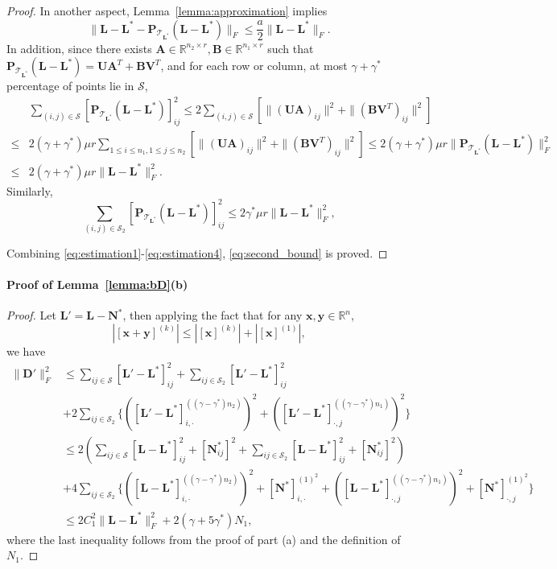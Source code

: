 \documentclass[12pt]{article}
\newcommand{\bx}{\boldsymbol{x}}
\newcommand{\by}{\boldsymbol{y}}
\newcommand{\bL}{\boldsymbol{L}}
\newcommand{\bP}{\boldsymbol{P}}
\newcommand{\bD}{\boldsymbol{D}}
\newcommand{\bU}{\boldsymbol{U}}
\newcommand{\bV}{\boldsymbol{V}}
\def\reals{\mathbb{R}}
\def\bx{\boldsymbol{x}}
\def\bP{\boldsymbol{P}}
\def\bU{\boldsymbol{U}}
\def\bA{\boldsymbol{A}}
\def\bB{\boldsymbol{B}}
\def\bN{\boldsymbol{N}}
\theoremstyle{plain}
\theoremstyle{definition}
\theoremstyle{plain}
\theoremstyle{plain}
\theoremstyle{remark}
\begin{document}
\begin{proof}
In another aspect, Lemma~\ref{lemma:approximation} implies
\begin{equation}
\|\bL-\bL^*-\bP_{\mathcal{T}_{\bL^*}}(\bL-\bL^*)\|_F\leq \frac{a}{2}\|\bL-\bL^*\|_F.\label{eq:estimation2}
\end{equation}
In addition, since there exists $\bA\in\reals^{n_2\times r},\bB\in\reals^{n_1\times r}$ such that $\bP_{\mathcal{T}_{\bL^*}}(\bL-\bL^*)=\bU\bA^T+\bB\bV^T$, and  for each row or column, at most $\gamma+\gamma^*$ percentage of points lie in $\mathcal{S}$, 
\begin{align}\nonumber
&\sum_{(i,j)\in\mathcal{S}}[\bP_{\mathcal{T}_{\bL^*}}(\bL-\bL^*)]_{ij}^2\leq 2 \sum_{(i,j)\in\mathcal{S}}[\|(\bU\bA)_{ij}\|^2+\|(\bB\bV^T)_{ij}\|^2]\\\leq&  2  (\gamma+\gamma^*)\mu r \sum_{1\leq i\leq n_1, 1\leq j\leq n_2}[\|(\bU\bA)_{ij}\|^2+\|(\bB\bV^T)_{ij}\|^2]\leq 2  (\gamma+\gamma^*)\mu r  \|\bP_{\mathcal{T}_{\bL^*}}(\bL-\bL^*)\|_F^2\nonumber\\
\leq &2(\gamma+\gamma^*)\mu r \|\bL-\bL^*\|_F^2.
\label{eq:estimation3}
\end{align}
Similarly,
\begin{equation}\label{eq:estimation4}
\sum_{(i,j)\in\mathcal{S}_2}[\bP_{\mathcal{T}_{\bL^*}}(\bL-\bL^*)]_{ij}^2\leq 2 \gamma^*\mu r \|\bL-\bL^*\|_F^2,
\end{equation}



Combining \eqref{eq:estimation1}-\eqref{eq:estimation4}, \eqref{eq:second_bound} is proved. 
\end{proof}

\paragraph*{Proof of Lemma~\ref{lemma:bD}(b)}
\begin{proof}
Let $\bL'=\bL-\bN^*$, then applying the fact that for any $\bx,\by\in\reals^n$,
\[
|[\bx+\by]^{(k)}|\leq |[\bx]^{(k)}|+|[\bx]^{(1)}|,
\]
we have
\begin{align*}
\|\bD'\|_{F}^{2} & \leq\sum_{ij\in\mathcal{S}}[\bL'-\bL^{*}]_{ij}^{2}+\sum_{ij\in\mathcal{S}_{2}}[\bL'-\bL^{*}]_{ij}^{2}\\
 & +2\sum_{ij\in\mathcal{S}_{2}}\{([\bL'-\bL^{*}]_{i,\cdot}^{((\gamma-\gamma^{*})n_{2})})^{2}+([\bL'-\bL^{*}]_{\cdot,j}^{((\gamma-\gamma^{*})n_{1})})^{2}\}\\
 & \leq2\left(\sum_{ij\in\mathcal{S}}[\bL-\bL^{*}]_{ij}^{2}+[\bN_{ij}^{*}]^{2}+\sum_{ij\in\mathcal{S}_{2}}[\bL-\bL^{*}]_{ij}^{2}+[\bN_{ij}^{*}]^{2}\right)\\
 & +4\sum_{ij\in\mathcal{S}_{2}}\{([\bL-\bL^{*}]_{i,\cdot}^{((\gamma-\gamma^{*})n_{2})})^{2}+[\bN^{*}]_{i,\cdot}^{(1)^{2}}+([\bL-\bL^{*}]_{\cdot,j}^{((\gamma-\gamma^{*})n_{1})})^{2}+[\bN^{*}]_{\cdot,j}^{(1)^{2}}\}\\
 & \leq2C_{1}^{2}\|\bL-\bL^{*}\|_{F}^{2}+2(\gamma+5\gamma^{*})N_{1},
\end{align*}
where the last inequality follows from the proof of part (a) and the definition of $N_1$.\end{proof}
\end{document}
